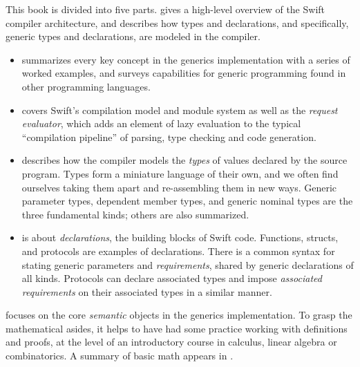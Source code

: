 \documentclass[../generics]{subfiles}
\begin{document}
This book is divided into five parts.  gives a high-level overview of the Swift compiler architecture, and describes how types and declarations, and specifically, generic types and declarations, are modeled in the compiler.
\begin{itemize}
\item {} summarizes every key concept in the generics implementation with a series of worked examples, and surveys capabilities for generic programming found in other programming languages.
\item {} covers Swift's compilation model and module system as well as the \emph{request evaluator}, which adds an element of lazy evaluation to the typical ``compilation pipeline'' of parsing, type checking and code generation.
\item {} describes how the compiler models the \emph{types} of values declared by the source program. Types form a miniature language of their own, and we often find ourselves taking them apart and re-assembling them in new ways. Generic parameter types, dependent member types, and generic nominal types are the three fundamental kinds; others are also summarized.
\item {} is about \emph{declarations}, the building blocks of Swift code. Functions, structs, and protocols are examples of declarations. There is a common syntax for stating generic parameters and \emph{requirements}, shared by generic declarations of all kinds. Protocols can declare associated types and impose \emph{associated requirements} on their associated types in a similar manner.
\end{itemize}
 focuses on the core \emph{semantic} objects in the generics implementation. To grasp the mathematical asides, it helps to have had some practice working with definitions and proofs, at the level of an introductory course in calculus, linear algebra or combinatorics. A summary of basic math appears in .
\end{document}
